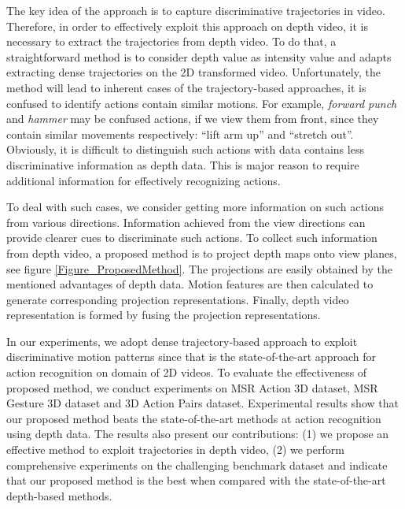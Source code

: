 \documentclass[final,3p,times,twocolumn]{elsarticle}
\begin{document}
The key idea of the approach is to capture discriminative trajectories in video.
Therefore, in order to effectively exploit this approach on depth video, it is necessary to extract the trajectories from depth video.
To do that, a straightforward method is to consider depth value as intensity value and adapts extracting dense trajectories on the 2D transformed video.
Unfortunately, the method will lead to inherent cases of the trajectory-based approaches, it is confused to identify actions contain similar motions.
For example, \textit{forward punch} and \textit{hammer} may be confused actions, if we view them from front, since they contain similar movements respectively: ``lift arm up'' and ``stretch out''.
Obviously, it is difficult to distinguish such actions with data contains less discriminative information as depth data.
This is major reason to require additional information for effectively recognizing actions.

To deal with such cases, we consider getting more information on such actions from various directions.
Information achieved from the view directions can provide clearer cues to discriminate such actions.
To collect such information from depth video, a proposed method is to project depth maps onto view planes, see figure \ref{Figure_ProposedMethod}.
The projections are easily obtained by the mentioned advantages of depth data.
Motion features are then calculated to generate corresponding projection representations.
Finally, depth video representation is formed by fusing the projection representations.

In our experiments, we adopt dense trajectory-based approach \cite{wang2011densetraj} to exploit discriminative motion patterns since that is the state-of-the-art approach for action recognition on domain of 2D videos.
To evaluate the effectiveness of proposed method, we conduct experiments on MSR Action 3D dataset, MSR Gesture 3D dataset and 3D Action Pairs dataset.
Experimental results show that our proposed method beats the state-of-the-art methods at action recognition using depth data.
The results also present our contributions: (1) we propose an effective method to exploit trajectories in depth video, (2) we perform comprehensive experiments on the challenging benchmark dataset and indicate that our proposed method is the best when compared with the state-of-the-art depth-based methods.
\end{document}
